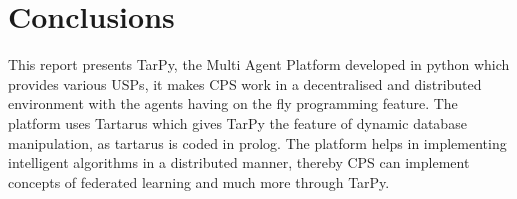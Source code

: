 \chapter{Conclusions}
\bigbreak
\large
This report presents TarPy, the Multi Agent Platform developed in python which provides various USPs, it makes CPS work in a decentralised and distributed environment with the agents having on the fly programming feature. The platform uses Tartarus which gives TarPy the feature of dynamic database manipulation, as tartarus is coded in prolog. The platform helps in implementing intelligent algorithms in a distributed manner, thereby CPS can implement concepts of federated learning and much more through TarPy.\par         